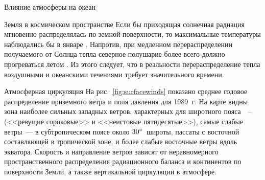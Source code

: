 \begin{chapter}{Влияние атмосферы на океан}
\begin{section}{Земля в космическом пространстве}
Если бы приходящая солнечная радиация мгновенно распределялась по
земной поверхности, то максимальные температуры наблюдались бы в
январе%
. 
Напротив, при медленном перераспределении получаемого от Солнца тепла северное
полушарие более всего должно прогреваться летом%
. 
Из этого следует, что в
реальности перераспределение тепла воздушными и океанскими течениями
требует значительного времени.
%
\end{section}

\begin{section}{Атмосферная циркуляция}
На рис.~\ref{fig:surfacewinds} показано среднее годовое распределение 
приземного ветра и поля давления для 1989~г. На карте видны зона наиболее 
сильных западных ветров, характерных для широтного 
пояса~~--~ (<<ревущие сороковые>> и 
<<неистовые пятидесятые>>), самые слабые ветры~--- в
субтропическом поясе около ${30}^\circ$~широты, пассаты с восточной
составляющей в тропической зоне, и более слабые восточные ветры вдоль
экватора. Скорость и направление ветров зависят от неравномерного 
пространственного распределения радиационного баланса и континентов 
по поверхности Земли, а также вертикальной циркуляции в атмосфере.
%


\end{section}
\end{chapter}

